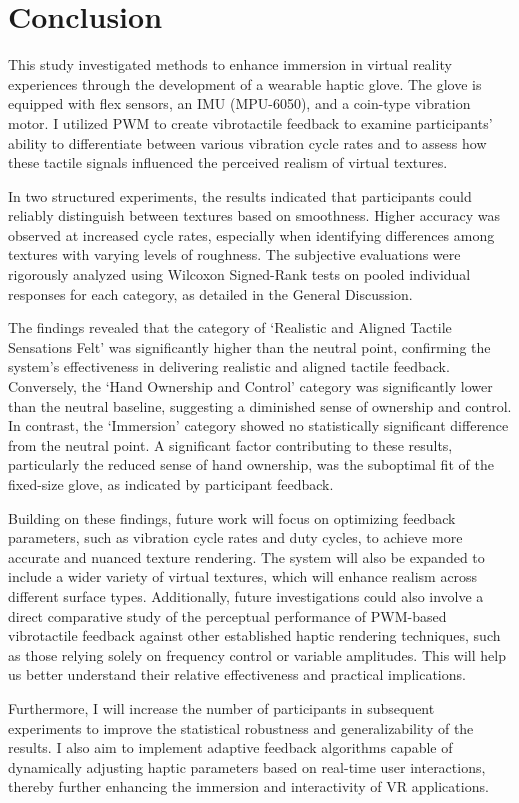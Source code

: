 \chapter{Conclusion} %

\label{Chapter6}

This study investigated methods to enhance immersion in virtual reality experiences through the development of a wearable haptic glove. The glove is equipped with flex sensors, an IMU (MPU-6050), and a coin-type vibration motor. I utilized PWM to create vibrotactile feedback to examine participants’ ability to differentiate between various vibration cycle rates and to assess how these tactile signals influenced the perceived realism of virtual textures.

In two structured experiments, the results indicated that participants could reliably distinguish between textures based on smoothness. Higher accuracy was observed at increased cycle rates, especially when identifying differences among textures with varying levels of roughness. The subjective evaluations were rigorously analyzed using Wilcoxon Signed-Rank tests on pooled individual responses for each category, as detailed in the General Discussion. 

The findings revealed that the category of `Realistic and Aligned Tactile Sensations Felt' was significantly higher than the neutral point, confirming the system's effectiveness in delivering realistic and aligned tactile feedback. Conversely, the `Hand Ownership and Control' category was significantly lower than the neutral baseline, suggesting a diminished sense of ownership and control. In contrast, the `Immersion' category showed no statistically significant difference from the neutral point. A significant factor contributing to these results, particularly the reduced sense of hand ownership, was the suboptimal fit of the fixed-size glove, as indicated by participant feedback.

Building on these findings, future work will focus on optimizing feedback parameters, such as vibration cycle rates and duty cycles, to achieve more accurate and nuanced texture rendering. The system will also be expanded to include a wider variety of virtual textures, which will enhance realism across different surface types. Additionally, future investigations could also involve a direct comparative study of the perceptual performance of PWM-based vibrotactile feedback against other established haptic rendering techniques, such as those relying solely on frequency control or variable amplitudes. This will help us better understand their relative effectiveness and practical implications.

Furthermore, I will increase the number of participants in subsequent experiments to improve the statistical robustness and generalizability of the results. I also aim to implement adaptive feedback algorithms capable of dynamically adjusting haptic parameters based on real-time user interactions, thereby further enhancing the immersion and interactivity of VR applications.





